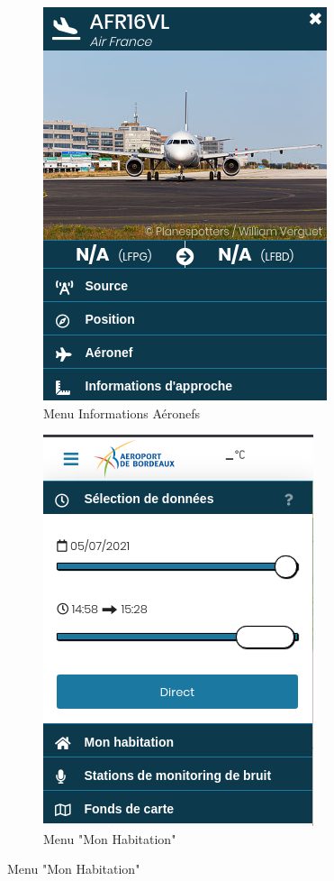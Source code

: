 \begin{figure}[hbt!]
  \begin{subfigure}{0.5\textwidth}
    \centering
    \includegraphics[width=.7\linewidth]{Images/aerovisioninfo.png}  
    \caption{Menu Informations Aéronefs}
    \label{fig:aerovisioninfo}
  \end{subfigure}
  \begin{subfigure}{0.5\textwidth}
    \centering
    \includegraphics[width=.7\linewidth]{Images/aerovisionmaison.png}  
    \caption{Menu "Mon Habitation"}
    \label{fig:aerovisionmaison}
  \end{subfigure}
\end{figure}

